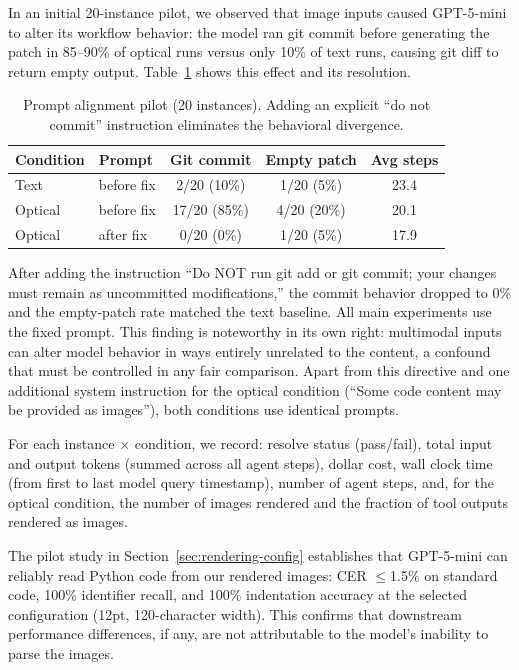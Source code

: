 \label{sec:prompt-alignment}
In an initial 20-instance pilot, we observed that image inputs caused GPT-5-mini to alter its workflow behavior: the model ran git commit before generating the patch in 85--90\% of optical runs versus only 10\% of text runs, causing git diff to return empty output. Table~\ref{tab:prompt-alignment} shows this effect and its resolution.

\begin{table}[t]
\centering
\caption{Prompt alignment pilot (20 instances). Adding an explicit ``do not commit'' instruction eliminates the behavioral divergence.}
\label{tab:prompt-alignment}
\small
\begin{tabular}{llccc}
\toprule
\textbf{Condition} & \textbf{Prompt} & \textbf{Git commit} & \textbf{Empty patch} & \textbf{Avg steps} \\
\midrule
Text          & before fix & 2/20 (10\%)  & 1/20 (5\%)  & 23.4 \\
Optical       & before fix & 17/20 (85\%) & 4/20 (20\%) & 20.1 \\
\midrule
Optical       & after fix  & 0/20 (0\%)   & 1/20 (5\%)  & 17.9 \\
\bottomrule
\end{tabular}
\end{table}

After adding the instruction ``Do NOT run git add or git commit; your changes must remain as uncommitted modifications,'' the commit behavior dropped to 0\% and the empty-patch rate matched the text baseline. All main experiments use the fixed prompt. This finding is noteworthy in its own right: multimodal inputs can alter model behavior in ways entirely unrelated to the content, a confound that must be controlled in any fair comparison. Apart from this directive and one additional system instruction for the optical condition (``Some code content may be provided as images''), both conditions use identical prompts.

For each instance $\times$ condition, we record: resolve status (pass/fail), total input and output tokens (summed across all agent steps), dollar cost, wall clock time (from first to last model query timestamp), number of agent steps, and, for the optical condition, the number of images rendered and the fraction of tool outputs rendered as images.

The pilot study in Section~\ref{sec:rendering-config} establishes that GPT-5-mini can reliably read Python code from our rendered images: CER $\le$1.5\% on standard code, 100\% identifier recall, and 100\% indentation accuracy at the selected configuration (12pt, 120-character width). This confirms that downstream performance differences, if any, are not attributable to the model's inability to parse the images.



